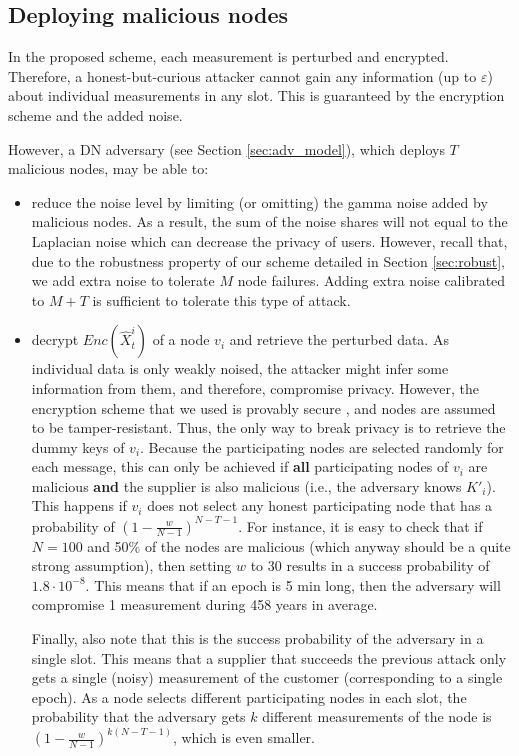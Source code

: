 \documentclass[11pt,a4paper]{article}
\theoremstyle{plain}
\theoremstyle{plain}
\theoremstyle{plain}
\theoremstyle{plain}
\theoremstyle{nonumberplain} \theoremseparator{}
\begin{document}
\subsection{Deploying malicious nodes}

In the proposed scheme, each measurement is perturbed and encrypted. 
Therefore, a honest-but-curious attacker cannot
gain any information (up to $\varepsilon$) about individual measurements in any slot. This is guaranteed by the encryption scheme and the added noise. 

However, a DN adversary (see Section \ref{sec:adv_model}), which deploys $T$ malicious nodes, may be able to:
\begin{itemize}
\item reduce the noise level by limiting (or omitting) the gamma noise added by
malicious nodes. As a result, the sum of the noise shares will not 
equal to the Laplacian noise which can decrease the privacy of users.
However, recall that, due to the robustness property of our scheme detailed in Section \ref{sec:robust}, we
add extra noise to tolerate $M$ node failures. Adding extra noise calibrated to $M+T$ is sufficient to tolerate this type of attack.

\item decrypt $\mathit{Enc}(\hat{X}_{t}^{i})$ of a node $v_i$ and retrieve the perturbed data. 
As individual data is only weakly noised, the attacker might infer 
some information from them, and therefore, compromise privacy. 
However, the encryption scheme that we used is provably 
secure  \cite{cc05mobiquitous}, and nodes are assumed to be tamper-resistant. 
Thus, the only way to break privacy is to retrieve the dummy keys of $v_i$.
Because the participating nodes are selected randomly for each message, 
this can only be achieved if {\bf all} participating nodes of $v_i$ are
malicious {\bf and} the supplier is also malicious (i.e., the adversary knows $K'_{i}$). This happens if $v_i$ does not select any honest participating node that has a probability of $(1-\frac{w}{N-1})^{N-T-1}$. For instance, it is easy to check that if $N = 100$ and 50\% of the nodes are malicious (which anyway should be a quite strong assumption), then setting $w$ to 30 results in a success probability of $1.8 \cdot 10^{-8}$. This means that if an epoch is 5 min long, then the adversary will compromise 1 measurement during 458 years in average. 


Finally, also note that this is the success probability of the adversary in a single slot. This means that a supplier that succeeds the previous attack only gets a single (noisy) measurement of 
the customer (corresponding to a single epoch). As a node selects different participating nodes in each slot, 
the probability that the adversary gets $k$ different measurements of the node is $(1-\frac{w}{N-1})^{k(N-T-1)}$, which is even smaller.
\end{itemize}
\end{document}
